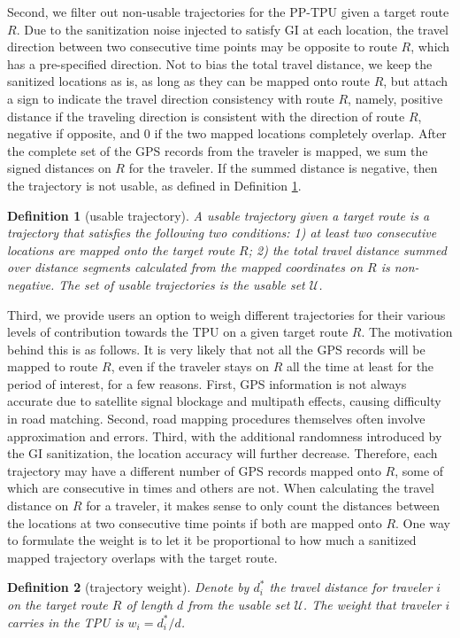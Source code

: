 \documentclass[10pt,journal,compsoc]{IEEEtran}
\newtheorem{defn}{Definition}
\begin{document}
Second, we filter out  non-usable trajectories for the PP-TPU  given a target route $R$. Due to the sanitization noise injected to satisfy GI at each location, the travel direction between two consecutive time points may be opposite to route $R$, which has  a pre-specified direction. Not to bias the total travel distance, we keep the  sanitized locations as is, as long as they can be mapped onto route $R$, but attach a sign to indicate the travel direction consistency with route $R$, namely, positive distance if the traveling direction  is consistent with the direction of route $R$, negative if opposite, and 0 if the two mapped locations completely overlap. After the complete set of the GPS records from the traveler is mapped, we sum the signed distances on $R$ for the traveler. If the summed distance is negative, then the trajectory is not usable, as defined in Definition \ref{def:usable}.
\begin{defn}[usable trajectory]\label{def:usable} A usable trajectory given a target route is a trajectory that satisfies the following two conditions: 1) at least two consecutive locations are mapped onto the target route $R$; 2) the total travel distance summed over distance segments calculated from the mapped coordinates on $R$ is non-negative.  The set of usable trajectories is the \emph{usable set $\mathcal{U}$}.
\end{defn}
\vspace{-3pt}
Third, we provide users an option to weigh different trajectories for their various levels of contribution towards the TPU on a given target route $R$. The motivation behind this is as follows. It is very likely that not all the GPS records will be mapped to route $R$, even if the traveler stays on $R$ all the time at least for the period of interest, for a few reasons. First,  GPS information is not always accurate due to satellite signal blockage and multipath effects, causing difficulty in road matching. Second, road mapping procedures themselves often involve approximation and errors. Third, with the additional randomness introduced by the GI sanitization, the location accuracy will further decrease. Therefore, each trajectory may have a different number of GPS records mapped onto $R$, some of which are consecutive in times and others are not. When calculating the travel distance on $R$ for a traveler, it makes sense to only count the distances between the locations at two consecutive time points if both are mapped onto  $R$. One way to formulate the weight is to let it be proportional to how much a sanitized mapped trajectory overlaps with the target route.
\begin{defn}[trajectory weight]\label{def:weight} Denote by $d^*_i$ the travel distance for traveler $i$ on the target route $R$ of length $d$ from the usable set $\mathcal{U}$. The weight that traveler $i$ carries in the TPU is  $w_i=d^*_i/d$.
\end{defn} \vspace{-3pt}
\end{document}
